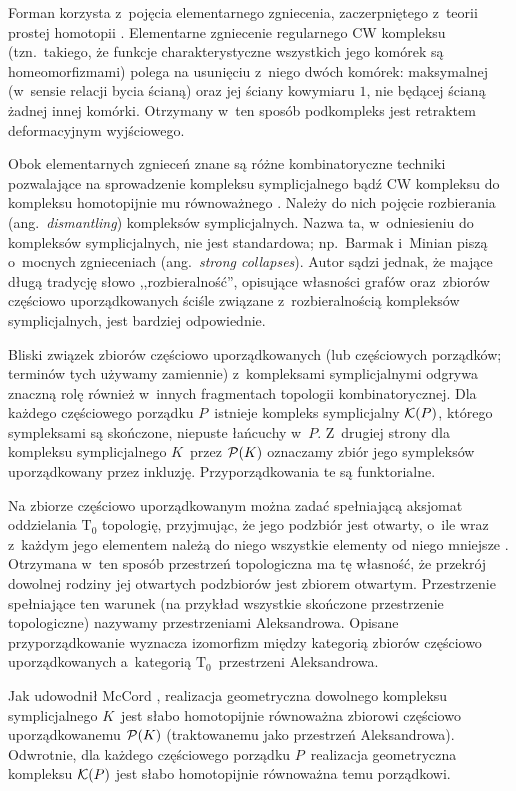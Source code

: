 Forman korzysta z~pojęcia elementarnego zgniecenia, zaczerpniętego z~teorii prostej homotopii \cite{Cohen73}. Elementarne zgniecenie regularnego CW kompleksu (tzn.~takiego, że funkcje charakterystyczne wszystkich jego komórek są homeomorfizmami) polega na usunięciu z~niego dwóch komórek: maksymalnej (w~sensie relacji bycia ścianą) oraz jej ściany kowymiaru $1$, nie będącej ścianą żadnej innej komórki. Otrzymany w~ten sposób podkompleks jest retraktem deformacyjnym wyjściowego.

Obok elementarnych zgnieceń znane są różne kombinatoryczne techniki pozwalające na sprowadzenie kompleksu symplicjalnego bądź CW kompleksu do kompleksu homotopijnie mu równoważnego \cite{Kozlov08,Jonsson08}. Należy do nich pojęcie rozbierania (ang.~\textit{dismantling}) kompleksów symplicjalnych. Nazwa ta, w~odniesieniu do kompleksów symplicjalnych, nie jest standardowa; np.~Barmak i~Minian \cite{Barmak12} piszą o~mocnych zgnieceniach (ang.~\textit{strong collapses}). Autor sądzi jednak, że mające długą tradycję słowo ,,rozbieralność'', opisujące własności grafów oraz~zbiorów częściowo uporządkowanych ściśle związane z~rozbieralnością kompleksów symplicjalnych, jest bardziej odpowiednie.

Bliski związek zbiorów częściowo uporządkowanych (lub częściowych porządków; terminów tych używamy zamiennie) z~kompleksami symplicjalnymi odgrywa znaczną rolę również w~innych fragmentach topologii kombinatorycznej. Dla każdego częściowego porządku $P$~istnieje kompleks symplicjalny $\mathcal{K}(P)$, którego sympleksami są skończone, niepuste łańcuchy w~$P$. Z~drugiej strony dla kompleksu symplicjalnego $K$~przez $\mathcal{P}(K)$ oznaczamy zbiór jego sympleksów uporządkowany przez inkluzję. Przyporządkowania te są funktorialne.

Na zbiorze częściowo uporządkowanym można zadać spełniającą aksjomat oddzielania $\mathrm{T_0}$ topologię, przyjmując, że jego podzbiór jest otwarty, o~ile wraz z~każdym jego elementem należą do niego wszystkie elementy od niego mniejsze \cite{Alexandroff37}. Otrzymana w~ten sposób przestrzeń topologiczna ma tę własność, że przekrój dowolnej rodziny jej otwartych podzbiorów jest zbiorem otwartym. Przestrzenie spełniające ten warunek (na przykład wszystkie skończone przestrzenie topologiczne) nazywamy przestrzeniami Aleksandrowa. Opisane przyporządkowanie wyznacza izomorfizm między kategorią zbiorów częściowo uporządkowanych a~kategorią $\mathrm{T_0}$~przestrzeni Aleksandrowa.

Jak udowodnił McCord \cite{McCord66}, realizacja geometryczna dowolnego kompleksu symplicjalnego $K$~jest słabo homotopijnie równoważna zbiorowi częściowo uporządkowanemu $\mathcal{P}(K)$ (traktowanemu jako przestrzeń Aleksandrowa). Odwrotnie, dla każdego częściowego porządku $P$~realizacja geometryczna kompleksu $\mathcal{K}(P)$ jest słabo homotopijnie równoważna temu porządkowi.

